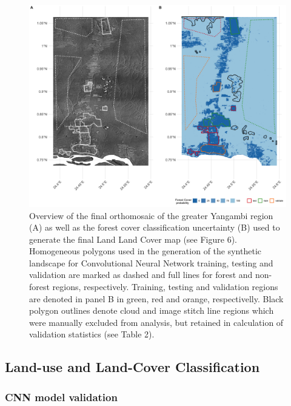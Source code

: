 \documentclass[remote sensing,article,submit,moreauthors,pdftex]{mdpi}
\begin{document}
\begin{figure}

{\centering \includegraphics[width=1\linewidth]{./figures/orthomosaic_maps} 

}

\caption{Overview of the final orthomosaic of the greater Yangambi region (A) as well as the forest cover classification uncertainty (B) used to generate the final Land Land Cover map (see Figure 6). Homogeneous polygons used in the generation of the synthetic landscape for Convolutional Neural Network training, testing and validation are marked as dashed and full lines for forest and non-forest regions, respectively. Training, testing and validation regions are denoted in panel B in green, red and orange, respectivelly. Black polygon outlines denote cloud and image stitch line regions which were manually excluded from analysis, but retained in calculation of validation statistics (see Table 2).}\label{fig:unnamed-chunk-6}
\end{figure}

\hypertarget{land-use-and-land-cover-classification}{%
\subsection{Land-use and Land-Cover
Classification}\label{land-use-and-land-cover-classification}}

\hypertarget{cnn-model-validation}{%
\subsubsection{CNN model validation}\label{cnn-model-validation}}
\end{document}
